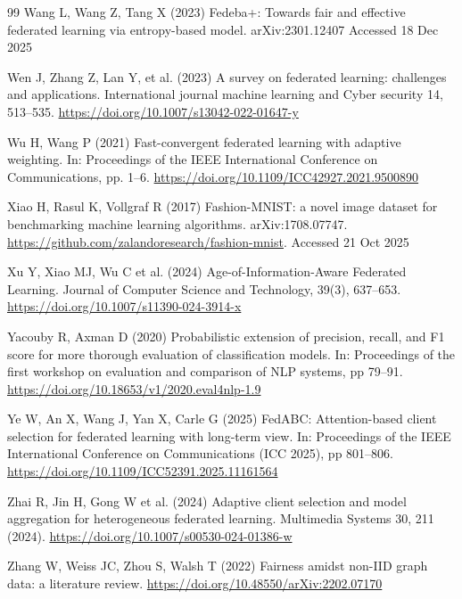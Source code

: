 \documentclass[pdflatex,sn-mathphys-num,oneside]{sn-jnl}%
\theoremstyle{thmstyleone}%
\theoremstyle{thmstyletwo}%
\theoremstyle{thmstylethree}%
\begin{document}
\begin{thebibliography}{99}
Wang L, Wang Z, Tang X (2023) Fedeba+: Towards fair and effective federated learning via entropy-based model. arXiv:2301.12407 Accessed 18 Dec 2025

Wen J, Zhang Z, Lan Y, et al. (2023) A survey on federated learning: challenges and applications. International journal machine learning and Cyber security 14, 513–535. \url{https://doi.org/10.1007/s13042-022-01647-y}

Wu H, Wang P (2021) Fast-convergent federated learning with adaptive weighting. In: Proceedings of the IEEE International Conference on Communications, pp. 1–6. \url{https://doi.org/10.1109/ICC42927.2021.9500890}

Xiao H, Rasul K, Vollgraf R (2017) Fashion-MNIST: a novel image dataset for benchmarking machine learning algorithms. arXiv:1708.07747. \url{https://github.com/zalandoresearch/fashion-mnist}. Accessed 21 Oct 2025

Xu Y, Xiao MJ, Wu C et al. (2024) Age-of-Information-Aware Federated Learning. Journal of Computer Science and Technology, 39(3), 637–653. \url{https://doi.org/10.1007/s11390-024-3914-x}

Yacouby R, Axman D (2020) Probabilistic extension of precision, recall, and F1 score for more thorough evaluation of classification models. In: Proceedings of the first workshop on evaluation and comparison of NLP systems, pp 79–91. \url{https://doi.org/10.18653/v1/2020.eval4nlp-1.9}

Ye W, An X, Wang J, Yan X, Carle G (2025) FedABC: Attention-based client selection for federated learning with long-term view. In: Proceedings of the IEEE International Conference on Communications (ICC 2025), pp 801–806. \url{https://doi.org/10.1109/ICC52391.2025.11161564}

Zhai R, Jin H, Gong W et al. (2024) Adaptive client selection and model aggregation for heterogeneous federated learning. Multimedia Systems 30, 211 (2024). \url{https://doi.org/10.1007/s00530-024-01386-w}

Zhang W, Weiss JC, Zhou S, Walsh T (2022) Fairness amidst non-IID graph data: a literature review. \url{https://doi.org/10.48550/arXiv:2202.07170}

\end{thebibliography}

    



\endgroup
\end{document}
